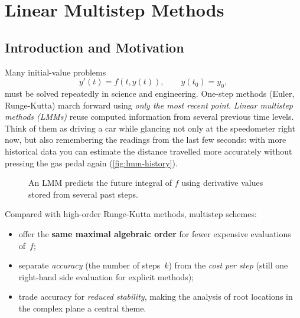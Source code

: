 \chapter{Linear Multistep Methods}
\label{chap:lmm}

\section{Introduction and Motivation}
\label{sec:lmm:intro}
Many initial-value problems
\begin{equation}
  y'(t)=f\left(t,y(t)\right), \qquad y(t_0)=y_0,
  \label{eq:ivp}
\end{equation}
must be solved repeatedly in science and engineering.
One-step methods (Euler, Runge-Kutta) march forward using \emph{only the most recent point}.
\emph{Linear multistep methods (LMMs)} reuse computed information from several previous time levels.
Think of them as driving a car while glancing not only at the speedometer right now, but also remembering the readings from the last few seconds: with more historical data you can estimate the distance travelled more accurately without pressing the gas pedal again (\autoref{fig:lmm-history}).

\begin{figure}[htbp]
  \centering
  \caption{An LMM predicts the future integral of $f$ using derivative values stored from several past steps.}
  \label{fig:lmm-history}
\end{figure}

Compared with high-order Runge-Kutta methods, multistep schemes:
\begin{itemize}
  \item offer the \textbf{same maximal algebraic order} for fewer expensive evaluations of~$f$;
  \item separate \emph{accuracy} (the number of steps~$k$) from the \emph{cost per step} (still one right-hand side evaluation for explicit methods);
  \item trade accuracy for \emph{reduced stability}, making the analysis of root locations in the complex plane a central theme.
\end{itemize}

